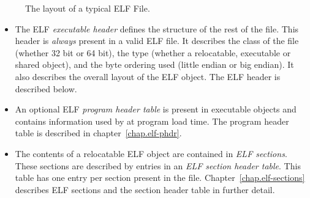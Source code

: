\documentclass[a4paper,pdftex]{book}
\newcommand{\firstterm}[1]{\textit{#1}}
\begin{document}
\begin{figure}
  \begin{center}
  \end{center}
  \caption{The layout of a typical ELF File.}\label{fig.elf.layout}
\end{figure}

\begin{itemize}
\item The ELF \firstterm{executable header}
  defines the structure of the rest of the file.  This header is
  \emph{always} present in a valid ELF file.  It describes the class
  of the file (whether 32 bit or 64 bit), the type (whether a
  relocatable, executable or shared object), and the byte ordering
  used (little endian or big endian).  It also describes the overall
  layout of the ELF object.  The ELF header is described below.

\item An optional ELF \firstterm{program header table}
   is present in executable objects and
  contains information used by at program load
  time.  The program header table is
  described in chapter~\vref{chap.elf-phdr}.

\item The contents of a relocatable ELF object are contained in
  \firstterm{ELF sections}.  These sections are
  described by entries in an \firstterm{ELF section header
    table}. This table has one entry
  per section present in the file.  Chapter~\vref{chap.elf-sections}
  describes ELF sections and the section header table in further
  detail.
\end{itemize}
\end{document}
